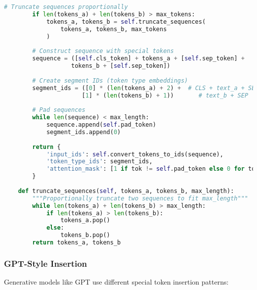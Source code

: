 \begin{lstlisting}[language=Python, caption=BERT-style special token insertion]
        # Truncate sequences proportionally
        if len(tokens_a) + len(tokens_b) > max_tokens:
            tokens_a, tokens_b = self.truncate_sequences(
                tokens_a, tokens_b, max_tokens
            )
        
        # Construct sequence with special tokens
        sequence = ([self.cls_token] + tokens_a + [self.sep_token] + 
                   tokens_b + [self.sep_token])
        
        # Create segment IDs (token type embeddings)
        segment_ids = ([0] * (len(tokens_a) + 2) +  # CLS + text_a + SEP
                      [1] * (len(tokens_b) + 1))       # text_b + SEP
        
        # Pad sequences
        while len(sequence) < max_length:
            sequence.append(self.pad_token)
            segment_ids.append(0)
            
        return {
            'input_ids': self.convert_tokens_to_ids(sequence),
            'token_type_ids': segment_ids,
            'attention_mask': [1 if tok != self.pad_token else 0 for tok in sequence]
        }
    
    def truncate_sequences(self, tokens_a, tokens_b, max_length):
        """Proportionally truncate two sequences to fit max_length"""
        while len(tokens_a) + len(tokens_b) > max_length:
            if len(tokens_a) > len(tokens_b):
                tokens_a.pop()
            else:
                tokens_b.pop()
        return tokens_a, tokens_b
\end{lstlisting}

\subsubsection{GPT-Style Insertion}

Generative models like GPT use different special token insertion patterns:

